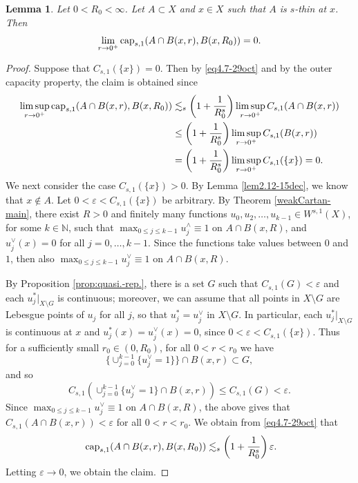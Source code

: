 \documentclass[11pt,leqno]{amsart}
\newtheorem{lemma}[theorem]{Lemma}
\numberwithin{equation}{section}
\theoremstyle{definition}
\begin{document}
	\begin{lemma}
		\label{lem3.16-26nov}
		Let 
		$0<R_0<\infty$.
		Let $A\subset X$ and $x\in X$ such that $A$ is $s$-thin at $x$.
		Then
		\[
		\lim_{r\to0^+}{\rm cap}_{s,1}(A\cap B(x,r), B(x, R_0))=0.
		\] 
	\end{lemma}
	\begin{proof}
		Suppose that $C_{s,1}(\{x\})=0$. Then 
		by \eqref{eq4.7-29oct} and by the outer capacity property, the claim is obtained since
		\begin{align*}
			\limsup_{r\to0^+} {\rm cap}_{s,1}(A\cap B(x,r),B(x,R_0))
			&\lesssim_s \left(1+\frac{1}{R_0^s}\right) \limsup_{r\to0^+} C_{s,1}(A\cap B(x,r))\\
			&\leq \left(1+\frac{1}{R_0^s}\right) \limsup_{r\to0^+} C_{s,1}(B(x,r))\\
			&=\left(1+\frac{1}{R_0^s}\right)\limsup_{r\to0^+} C_{s,1}(\{ x\})=0.
		\end{align*}
		We next consider the case $C_{s,1}(\{x\})>0$.
		By Lemma \ref{lem2.12-15dec}, we know that
		$x\not\in A$.
		Let $0<\varepsilon< C_{s,1}(\{x\})$ be arbitrary.
		By Theorem \ref{weakCartan-main}, there exist $R>0$ and finitely many functions
		$u_0,u_2,\ldots,u_{k-1} \in W^{s,1}(X)$, for some $k\in\mathbb N$, such that
		$\max_{0\le j\le k-1} u_j^\wedge \equiv 1$ on $A\cap B(x,R)$,
		and $u_j^\vee(x)=0$ for all $j=0,\ldots,k-1$.
		Since the functions take values between $0$ and $1$, then also
		$\max_{0\le j\le k-1} u_j^\vee \equiv 1$ on $A\cap B(x,R)$.
		
		By Proposition \ref{prop:quasi.-rep.}, there is a set $G$ such that
		$C_{s,1}(G)<\varepsilon$ and each $u^*_j|_{X\setminus G}$ is continuous;
		moreover, we can assume that all points in $X\setminus G$ are Lebesgue points
		of $u_j$ for all $j$, so that $u_j^*=u_j^{\vee}$ in $X\setminus G$.
		In particular, each $u^*_j|_{X\setminus G}$ is continuous at $x$ 
		{ and $u^*_j(x)=u_j^\vee(x)=0$,
		}
		since $0<\varepsilon< C_{s,1}(\{x\})$.
		Thus for a sufficiently small $r_0\in (0,R_0)$,  for all $0<r<r_0$ we have 
		\[
		\{ 
		{ \cup_{j=0}^{k-1}\{ u_j^\vee = 1\}}
		\} \cap B(x,r) \subset G,
		\]
		and so 
		\[
		C_{s,1}(
		{\cup_{j=0}^{k-1}\{ u_j^\vee = 1\}\cap B(x,r)}
		) \leq C_{s,1}(G) <\varepsilon.
		\]
		Since 
		{$\max_{0\leq j\leq k-1} u_j^\vee\equiv 1$}
		on $A\cap B(x,R)$,  the above gives that $C_{s,1}(A\cap B(x,r))<\varepsilon$ for all $0<r<r_0$.
		We obtain from \eqref{eq4.7-29oct} that
		\[
		\ {\rm cap}_{s,1}(A\cap B(x,r),B(x,R_0))
		\lesssim_s \left(1+\frac{1}{R_0^s}\right)\varepsilon.
		\] 
		Letting $\varepsilon\to 0$, we obtain the  claim. 
	\end{proof}
	
\end{document}
